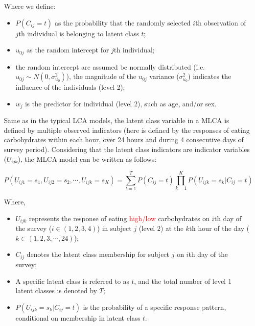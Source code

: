Where we define: 

\begin{itemize}
	\item $P(C_{ij} = t)$ as the probability that the randomly selected $i$th observation of $j$th individual is belonging to latent class $t$;
	\item $u_{0j}$ as the random intercept for $j$th individual; 
	\item the random intercept are assumed be normally distributed (i.e. $u_{0j} \sim N(0, \sigma_{u_0}^2)$), the magnitude of the $u_{0j}$ variance ($\sigma_{u_0}^2$) indicates the influence of the individuals (level 2);
	\item $w_j$ is the predictor for individual (level 2), such as age, and/or sex.
\end{itemize}


Same as in the typical LCA models, the latent class variable in a MLCA is defined by multiple observed indicators (here is defined by the responses of eating carbohydrates within each hour, over 24 hours and during 4 consecutive days of survey period). Considering that the latent class indicators are indicator variables ($U_{ijk}$), the MLCA model can be written as follows:\vspace{-0.8cm}

\begin{equation}
P(U_{ij1} = s_1, U_{ij2} = s_2, \cdots, U_{ijk} = s_{K}) = \sum_{t=1}^{T}P(C_{ij}=t)\prod_{k=1}^{K}P(U_{ijk} = s_k | C_{ij} = t)
\label{MLCA}
\end{equation}
\vspace{-0.8cm}


Where, 

\begin{itemize}
	\item $ U_{ijk} $ represents the response of eating \textcolor{red}{high/low} carbohydrates on $i$th day of the survey ($i \in (1,2,3,4)$) in subject $j$ (level 2) at the $k$th hour of the day ($k \in (1, 2, 3, \cdots, 24)$);
	\item $C_{ij}$ denotes the latent class membership for subject $j$ on $i$th day of the survey;
	\item A specific latent class is referred to as $t$, and the total number of level 1 latent classes is denoted by $T$;
	\item $P(U_{ijk} = s_k|C_{ij} = t)$ is the probability of a specific response pattern, conditional on membership in latent class $t$.
\end{itemize}


